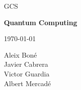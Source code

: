 

\thispagestyle{empty}
\clearpage
\setcounter{page}{-1}

\begin{titlepage}
{
    \centering
    \null
    \vfill
    {\Large GCS\par}
    \vspace{2em}
    {\Huge \bfseries
        Quantum Computing
    \par}
    \vspace{2em}
    {\large \scshape
        \today
    \par}
    \vfill
\begin{center}

\end{center}
    \vspace{3cm}

    \vfill
    {\raggedleft \large
Aleix Boné\\
Javier Cabrera\\
Victor Guardia\\
Albert Mercadé
        \par}
}
\end{titlepage}

